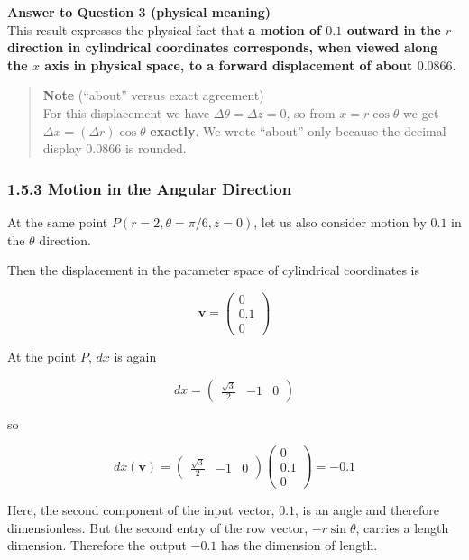 \documentclass[a4paper,12pt,openany]{book}
\begin{document}
\textbf{Answer to Question 3 (physical meaning)}\\
This result expresses the physical fact that \textbf{a motion of \(0.1\)
outward in the \(r\) direction in cylindrical coordinates corresponds,
when viewed along the \(x\) axis in physical space, to a forward
displacement of about \(0.0866\).}

\begin{quote}
\textbf{Note} (``about'' versus exact agreement)\\
For this displacement we have \(\Delta\theta=\Delta z=0\), so from
\(x=r\cos\theta\) we get \(\Delta x=(\Delta r)\cos\theta\)
\textbf{exactly}. We wrote ``about'' only because the decimal display
\(0.0866\) is rounded.
\end{quote}

\hypertarget{motion-in-the-angular-direction}{%
\subsubsection{1.5.3 Motion in the Angular
Direction}\label{motion-in-the-angular-direction}}

At the same point \(P(r=2,\theta=\pi/6,z=0)\), let us also consider
motion by \(0.1\) in the \(\theta\) direction.

Then the displacement in the parameter space of cylindrical coordinates
is

\[
\mathbf{v}
=
\begin{pmatrix}
0\\
0.1\\
0
\end{pmatrix}
\]

At the point \(P\), \(dx\) is again

\[
dx
=
\begin{pmatrix}
\frac{\sqrt{3}}{2} & -1 & 0
\end{pmatrix}
\]

so

\[
dx(\mathbf{v})
=
\begin{pmatrix}
\frac{\sqrt{3}}{2} & -1 & 0
\end{pmatrix}
\begin{pmatrix}
0\\
0.1\\
0
\end{pmatrix}
=
-0.1
\]

Here, the second component of the input vector, \(0.1\), is an angle and
therefore dimensionless. But the second entry of the row vector,
\(-r\sin\theta\), carries a length dimension. Therefore the output
\(-0.1\) has the dimension of length.
\end{document}
